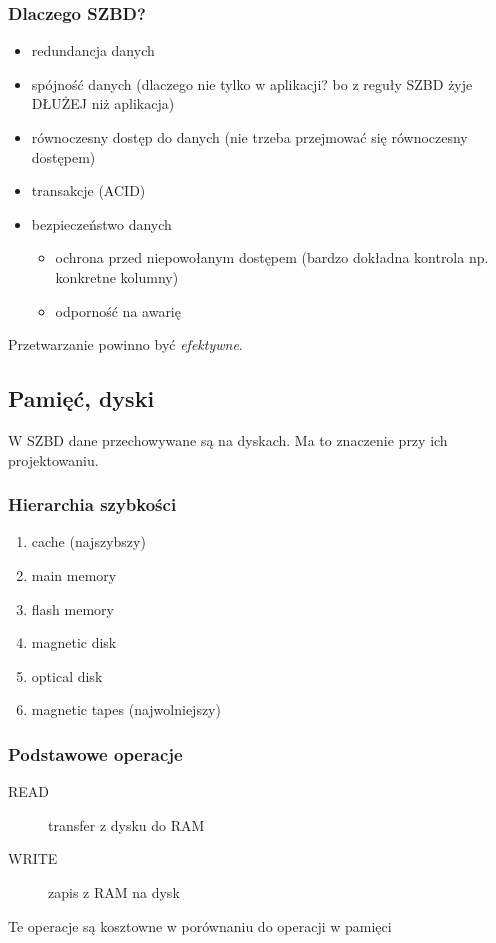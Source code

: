 \documentclass[12pt]{article}
\begin{document}
\subsubsection{Dlaczego \acs{SZBD}?}
\begin{itemize}
\item redundancja danych
\item spójność danych (dlaczego nie tylko w aplikacji? bo z reguły \ac{SZBD} żyje DŁUŻEJ niż aplikacja)
\item równoczesny dostęp do danych (nie trzeba przejmować się równoczesny dostępem)
\item transakcje (\ac{ACID})
\item bezpieczeństwo danych
\begin{itemize}
\item ochrona przed niepowołanym dostępem (bardzo dokładna kontrola np. konkretne kolumny)
\item odporność na awarię
\end{itemize}
\end{itemize}
Przetwarzanie powinno być \emph{efektywne}.

\subsection{Pamięć, dyski}
W \ac{SZBD} dane przechowywane są na dyskach. Ma to znaczenie przy ich projektowaniu.

\subsubsection{Hierarchia szybkości}
\begin{enumerate}
\item cache (najszybszy)
\item main memory
\item flash memory
\item magnetic disk
\item optical disk
\item magnetic tapes (najwolniejszy)
\end{enumerate}

\subsubsection{Podstawowe operacje}
\begin{description}
\item[READ] transfer z dysku do RAM
\item[WRITE] zapis z RAM na dysk
\end{description}
Te operacje są kosztowne w porównaniu do operacji w pamięci
\end{document}
